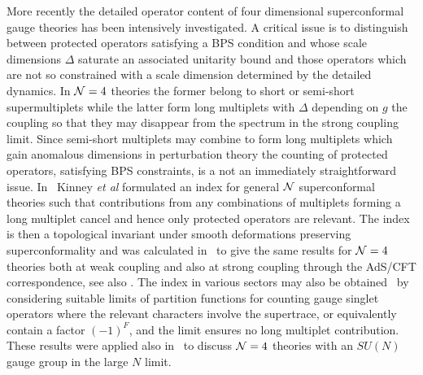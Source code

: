 More recently the detailed operator content of four dimensional 
superconformal gauge theories has been intensively investigated. A critical
issue is to distinguish between protected operators satisfying a BPS condition
and whose scale dimensions $\Delta$ saturate an associated unitarity bound and those 
operators which are not so constrained with a scale dimension determined by the
detailed dynamics. In ${\cal N}=4$ theories the former belong
to short or semi-short supermultiplets while the latter form long multiplets
with $\Delta$ depending on $g$ the coupling so that they may disappear from the 
spectrum in the strong coupling limit. Since semi-short multiplets may
combine to form long multiplets which gain anomalous dimensions in perturbation
theory the counting of protected operators, satisfying BPS constraints, is a 
not an immediately straightforward issue. In \mald\ Kinney {\it et al} formulated 
an index for general ${\cal N}$ superconformal theories such that contributions from any
combinations of multiplets forming a long multiplet cancel and hence only
protected operators are relevant. The index is then a topological invariant under
smooth deformations preserving superconformality
and was calculated in \mald\ to give the same results for ${\cal N}=4$ theories both at
weak coupling and also at strong coupling through the AdS/CFT correspondence, see 
also \janik. The index in various sectors may also be obtained \char\ by considering
suitable limits of partition functions for counting gauge singlet operators where 
the relevant characters involve the supertrace, or equivalently contain a factor 
$(-1)^F$, and the limit ensures no long multiplet contribution. These results 
were applied also in \char\
to discuss ${\cal N}=4$ theories with an $SU(N)$ gauge group in the large $N$ limit.

